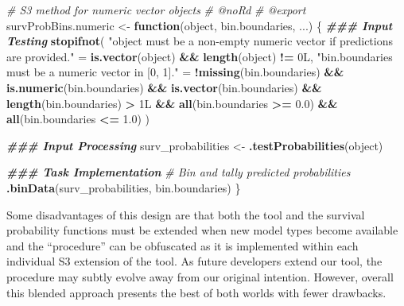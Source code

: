 \documentclass[
]{book}
\newenvironment{Shaded}{\begin{snugshade}}{\end{snugshade}}
\newcommand{\CommentTok}[1]{\textcolor[rgb]{0.56,0.35,0.01}{\textit{#1}}}
\newcommand{\ControlFlowTok}[1]{\textcolor[rgb]{0.13,0.29,0.53}{\textbf{#1}}}
\newcommand{\DocumentationTok}[1]{\textcolor[rgb]{0.56,0.35,0.01}{\textbf{\textit{#1}}}}
\newcommand{\FloatTok}[1]{\textcolor[rgb]{0.00,0.00,0.81}{#1}}
\newcommand{\FunctionTok}[1]{\textcolor[rgb]{0.13,0.29,0.53}{\textbf{#1}}}
\newcommand{\NormalTok}[1]{#1}
\newcommand{\OtherTok}[1]{\textcolor[rgb]{0.56,0.35,0.01}{#1}}
\newcommand{\SpecialCharTok}[1]{\textcolor[rgb]{0.81,0.36,0.00}{\textbf{#1}}}
\newcommand{\StringTok}[1]{\textcolor[rgb]{0.31,0.60,0.02}{#1}}
\begin{document}
\begin{Shaded}
\begin{Highlighting}[]
\CommentTok{\#\textquotesingle{} S3 method for numeric vector objects}
\CommentTok{\#\textquotesingle{} @noRd}
\CommentTok{\#\textquotesingle{} @export}
\NormalTok{survProbBins.numeric }\OtherTok{\textless{}{-}} \ControlFlowTok{function}\NormalTok{(object, bin.boundaries, ...) \{}
  \DocumentationTok{\#\#\# Input Testing}
  \FunctionTok{stopifnot}\NormalTok{(}
    \StringTok{"\textasciigrave{}object\textasciigrave{} must be a non{-}empty numeric vector if predictions are provided."} \OtherTok{=}
      \FunctionTok{is.vector}\NormalTok{(object) }\SpecialCharTok{\&\&} \FunctionTok{length}\NormalTok{(object) }\SpecialCharTok{!=}\NormalTok{ 0L,}
    \StringTok{"\textasciigrave{}bin.boundaries\textasciigrave{} must be a numeric vector in [0, 1]."} \OtherTok{=} 
      \SpecialCharTok{!}\FunctionTok{missing}\NormalTok{(bin.boundaries) }\SpecialCharTok{\&\&} \FunctionTok{is.numeric}\NormalTok{(bin.boundaries) }\SpecialCharTok{\&\&} 
        \FunctionTok{is.vector}\NormalTok{(bin.boundaries) }\SpecialCharTok{\&\&} \FunctionTok{length}\NormalTok{(bin.boundaries) }\SpecialCharTok{\textgreater{}}\NormalTok{ 1L }\SpecialCharTok{\&\&} 
        \FunctionTok{all}\NormalTok{(bin.boundaries }\SpecialCharTok{\textgreater{}=} \FloatTok{0.0}\NormalTok{) }\SpecialCharTok{\&\&} \FunctionTok{all}\NormalTok{(bin.boundaries }\SpecialCharTok{\textless{}=} \FloatTok{1.0}\NormalTok{)}
\NormalTok{  )}
  
  \DocumentationTok{\#\#\# Input Processing}
\NormalTok{  surv\_probabilities }\OtherTok{\textless{}{-}} \FunctionTok{.testProbabilities}\NormalTok{(object)}
  
  \DocumentationTok{\#\#\# Task Implementation}
  \CommentTok{\# Bin and tally predicted probabilities}
  \FunctionTok{.binData}\NormalTok{(surv\_probabilities, bin.boundaries)}
\NormalTok{\}}
\end{Highlighting}
\end{Shaded}

Some disadvantages of this design are that both the tool and the survival probability functions must be extended when new model types become available and the ``procedure'' can be obfuscated as it is implemented within each individual S3 extension of the tool. As future developers extend our tool, the procedure may subtly evolve away from our original intention. However, overall this blended approach presents the best of both worlds with fewer drawbacks.
\end{document}
